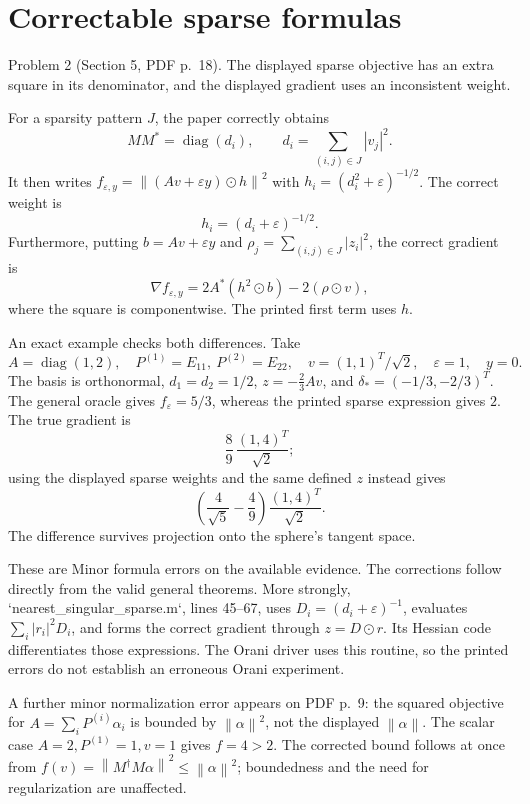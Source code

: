 \documentclass[10pt]{article}
\begin{document}
\section*{Correctable sparse formulas}
Problem 2 (Section 5, PDF p. 18).  The displayed sparse objective has an extra square in its denominator, and the displayed gradient uses an inconsistent weight.\par
For a sparsity pattern \(J\), the paper correctly obtains \[MM^*=\operatorname{diag}(d_i),\qquad
 d_i=\sum_{(i,j)\in J}|v_j|^2 .\] It then writes \(f_{\varepsilon,y}=\left\lVert(Av+\varepsilon y)\odot h\right\rVert^2\) with \(h_i=(d_i^2+\varepsilon)^{-1/2}\). The correct weight is \[h_i=(d_i+\varepsilon)^{-1/2}.\] Furthermore, putting \(b=Av+\varepsilon y\) and \(\rho_j=\sum_{(i,j)\in J}|z_i|^2\), the correct gradient is \[\nabla f_{\varepsilon,y}
 =2A^*(h^2\odot b)-2(\rho\odot v),\] where the square is componentwise. The printed first term uses \(h\).\par
An exact example checks both differences. Take \[A=\operatorname{diag}(1,2),\quad
 P^{(1)}=E_{11},\ P^{(2)}=E_{22},\quad
 v=(1,1)^T/\sqrt2,\quad \varepsilon=1,\quad y=0 .\] The basis is orthonormal, \(d_1=d_2=1/2\), \(z=-\tfrac23 Av\), and \(\delta_*=(-1/3,-2/3)^T\). The general oracle gives \(f_\varepsilon=5/3\), whereas the printed sparse expression gives \(2\). The true gradient is \[\frac89\,\frac{(1,4)^T}{\sqrt2};\] using the displayed sparse weights and the same defined \(z\) instead gives \[\left(\frac4{\sqrt5}-\frac49\right)
      \frac{(1,4)^T}{\sqrt2}.\] The difference survives projection onto the sphere’s tangent space.\par
These are Minor formula errors on the available evidence. The corrections follow directly from the valid general theorems. More strongly, `nearest\_singular\_sparse.m`, lines 45–67, uses \(D_i=(d_i+\varepsilon)^{-1}\), evaluates \(\sum_i|r_i|^2D_i\), and forms the correct gradient through \(z=D\odot r\). Its Hessian code differentiates those expressions. The Orani driver uses this routine, so the printed errors do not establish an erroneous Orani experiment.\par
A further minor normalization error appears on PDF p. 9: the squared objective for \(A=\sum_iP^{(i)}\alpha_i\) is bounded by \(\left\lVert\alpha\right\rVert^2\), not the displayed \(\left\lVert\alpha\right\rVert\). The scalar case \(A=2,P^{(1)}=1,v=1\) gives \(f=4>2\). The corrected bound follows at once from \(f(v)=\left\lVert M^\dagger M\alpha\right\rVert^2\le\left\lVert\alpha\right\rVert^2\); boundedness and the need for regularization are unaffected.\par
\end{document}
